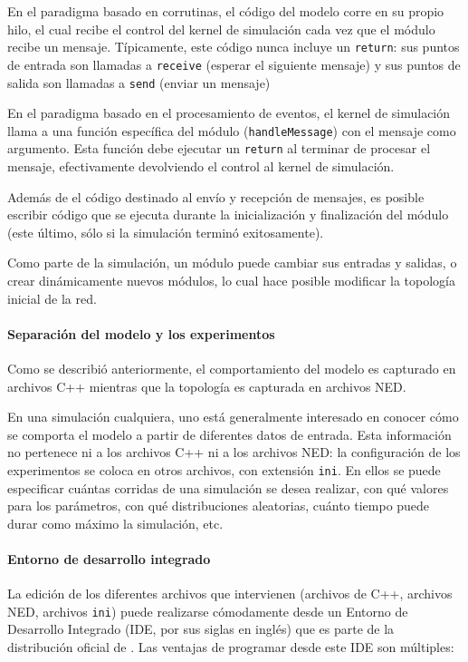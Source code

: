 En el paradigma basado en corrutinas, el código del modelo corre en su propio
hilo, el cual recibe el control del kernel de simulación cada vez que el módulo
recibe un mensaje. Típicamente, este código nunca incluye un \verb!return!: sus
puntos de entrada son llamadas a \verb!receive! (esperar el siguiente mensaje)
y sus puntos de salida son llamadas a \verb!send! (enviar un mensaje)

En el paradigma basado en el procesamiento de eventos, el kernel de simulación
llama a una función específica del módulo (\verb!handleMessage!) con el mensaje
como argumento. Esta función debe ejecutar un \verb!return! al terminar de
procesar el mensaje, efectivamente devolviendo el control al kernel de
simulación.

Además de el código destinado al envío y recepción de mensajes, es posible
escribir código que se ejecuta durante la inicialización y finalización del
módulo (este último, sólo si la simulación terminó exitosamente).

Como parte de la simulación, un módulo puede cambiar sus entradas y salidas, o
crear dinámicamente nuevos módulos, lo cual hace posible modificar la topología
inicial de la red.

\paragraph{Separación del modelo y los experimentos}

Como se describió anteriormente, el comportamiento del modelo es capturado en
archivos C++ mientras que la topología es capturada en archivos NED.

En una simulación cualquiera, uno está generalmente interesado en conocer cómo
se comporta el modelo a partir de diferentes datos de entrada. Esta información
no pertenece ni a los archivos C++ ni a los archivos NED: la configuración de
los experimentos se coloca en otros archivos, con extensión \verb!ini!. En
ellos se puede especificar cuántas corridas de una simulación se desea
realizar, con qué valores para los parámetros, con qué distribuciones
aleatorias, cuánto tiempo puede durar como máximo la simulación, etc.

\paragraph{Entorno de desarrollo integrado}

La edición de los diferentes archivos que intervienen (archivos de C++,
archivos NED, archivos \texttt{ini}) puede realizarse cómodamente desde un Entorno de
Desarrollo Integrado (IDE, por sus siglas en inglés) que es parte de la
distribución oficial de \omnetpp{}. Las ventajas de programar desde este IDE son
múltiples:

